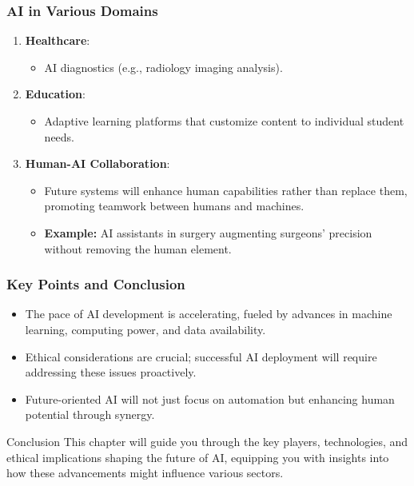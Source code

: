 \documentclass{beamer}
\begin{document}
\begin{frame}[fragile]
    \frametitle{AI in Various Domains}
    \begin{enumerate}
        \item \textbf{Healthcare}:
            \begin{itemize}
                \item AI diagnostics (e.g., radiology imaging analysis).
            \end{itemize}
        \item \textbf{Education}:
            \begin{itemize}
                \item Adaptive learning platforms that customize content to individual student needs.
            \end{itemize}
        \item \textbf{Human-AI Collaboration}:
            \begin{itemize}
                \item Future systems will enhance human capabilities rather than replace them, promoting teamwork between humans and machines.
                \item \textbf{Example:} AI assistants in surgery augmenting surgeons' precision without removing the human element.
            \end{itemize}
    \end{enumerate}
\end{frame}

\begin{frame}[fragile]
    \frametitle{Key Points and Conclusion}
    \begin{itemize}
        \item The pace of AI development is accelerating, fueled by advances in machine learning, computing power, and data availability.
        \item Ethical considerations are crucial; successful AI deployment will require addressing these issues proactively.
        \item Future-oriented AI will not just focus on automation but enhancing human potential through synergy.
    \end{itemize}
    
    \begin{block}{Conclusion}
        This chapter will guide you through the key players, technologies, and ethical implications shaping the future of AI, equipping you with insights into how these advancements might influence various sectors.
    \end{block}
\end{frame}
\end{document}
